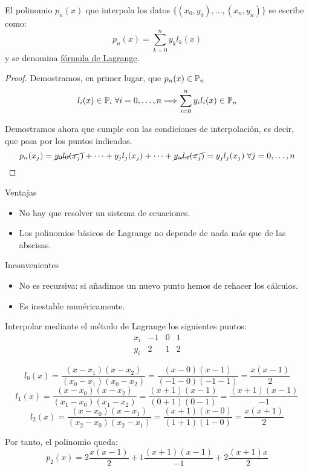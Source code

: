 \begin{teo}
    El polinomio $p_n(x)$ que interpola los datos $\{(x_0,y_0), \ldots, (x_n,y_n)\}$ se escribe como:
    $$p_n(x) = \sum_{k=0}^n y_kl_k(x)$$
    y se denomina \underline{fórmula de Lagrange}.
\end{teo}
\begin{proof}
    Demostramos, en primer lugar, que $p_n(x)\in \mathbb{P}_n$
    $$l_i(x)\in \mathbb{P}_i \; \forall i=0, \dots, n \Longrightarrow \sum_{i=0}^n y_il_i(x) \in \mathbb{P}_n $$

    Demostramos ahora que cumple con las condiciones de interpolación, es decir, que pasa por los puntos indicados.
    $$p_n(x_j) = \cancel{y_0l_0(x_j)} + \dots + y_jl_j(x_j) + \dots + \cancel{y_nl_n(x_j)} = y_jl_j(x_j) \;\forall j=0, \dots, n$$
\end{proof}
\noindent
Ventajas
\begin{itemize}
    \item No hay que resolver un sistema de ecuaciones.
    \item Los polinomios básicos de Lagrange no depende de nada más que de las abscisas.
\end{itemize}
Inconvenientes
\begin{itemize}
    \item No es recursiva: si añadimos un nuevo punto hemos de rehacer los cálculos.
    \item Es inestable numéricamente.
\end{itemize}

\begin{ejemplo}
    Interpolar mediante el método de Lagrange los siguientes puntos:
    \begin{equation*}
        \begin{array}{c|ccc}
            x_i & -1 & 0 & 1 \\ \hline
            y_i & 2 & 1 & 2
        \end{array}
    \end{equation*}

    \begin{equation*}
        l_0(x) = \frac{(x-x_1)(x-x_2)}{(x_0-x_1)(x_0-x_2)} = \frac{(x-0)(x-1)}{(-1-0)(-1-1)} = \frac{x(x-1)}{2}
    \end{equation*}
    \begin{equation*}
        l_1(x) = \frac{(x-x_0)(x-x_2)}{(x_1-x_0)(x_1-x_2)} = \frac{(x+1)(x-1)}{(0+1)(0-1)} = \frac{(x+1)(x-1)}{-1}
    \end{equation*}
    \begin{equation*}
        l_2(x) = \frac{(x-x_0)(x-x_1)}{(x_2-x_0)(x_2-x_1)} = \frac{(x+1)(x-0)}{(1+1)(1-0)} = \frac{x(x+1)}{2}
    \end{equation*}

    Por tanto, el polinomio queda:
    \begin{equation*}
        p_2(x) = 2\frac{x(x-1)}{2} + 1\frac{(x+1)(x-1)}{-1} + 2\frac{(x+1)x}{2}
    \end{equation*}
\end{ejemplo}

